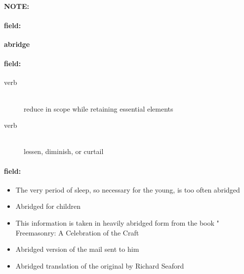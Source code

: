 \documentclass[12pt]{article}
\newenvironment{note}{\paragraph{NOTE:}}{}
\newenvironment{field}{\paragraph{field:}}{}
\begin{document}
\begin{note}
\begin{field}
\textbf{\large abridge}
\end{field}


\begin{field}
\begin{description}
\item[verb] \hfill \\ 
reduce in scope while retaining essential elements

\item[verb] \hfill \\ 
lessen, diminish, or curtail

\end{description}
\end{field}

\begin{field}
\begin{itemize}
\item The very period of sleep, so necessary for the young, is too often abridged
\item Abridged for children
\item This information is taken in heavily abridged form from the book " Freemasonry: A Celebration of the Craft
\item Abridged version of the mail sent to him
\item Abridged translation of the original by Richard Seaford
\end{itemize}
\end{field}
\end{note}
\end{document}
